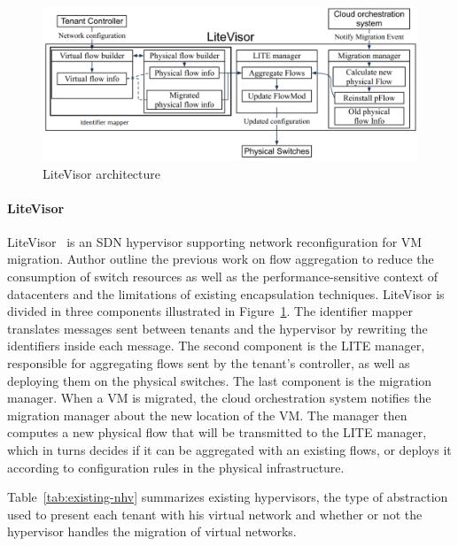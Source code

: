 

\begin{figure}[ht]
    \centering
    \includegraphics[scale=0.5]{figures/litevisor.pdf}
    \caption{LiteVisor architecture~\cite{Litevisor-Yang2018}}
    \label{fig:litevisor}
\end{figure}

\paragraph{LiteVisor}
LiteVisor~\cite{Litevisor-Yang2018} is an SDN hypervisor supporting network reconfiguration for VM migration.
Author outline the previous work on flow aggregation to reduce the consumption of switch resources as well as the performance-sensitive context of datacenters and the limitations of existing encapsulation techniques.
LiteVisor is divided in three components illustrated in Figure~\ref{fig:litevisor}. The identifier mapper translates messages sent between tenants and the hypervisor by rewriting the identifiers inside each message.
The second component is the LITE manager, responsible for aggregating flows sent by the tenant's controller, as well as deploying them on the physical switches. 
The last component is the migration manager. When a VM is migrated, the cloud orchestration system notifies the migration manager about the new location of the VM. The manager then computes a new physical flow that will be transmitted to the LITE manager, which in turns decides if it can be aggregated with an existing flows, or deploys it according to configuration rules in the physical infrastructure.

Table~\ref{tab:existing-nhv} summarizes existing hypervisors, the type of abstraction used to present each tenant with his virtual network and whether or not the hypervisor handles the migration of virtual networks.